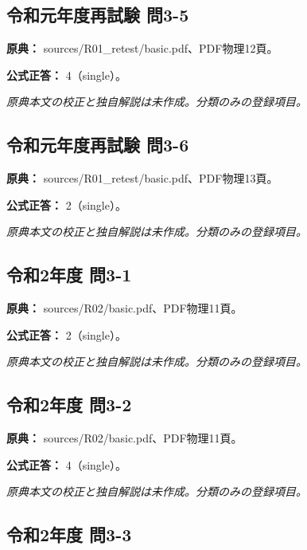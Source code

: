 \subsection{令和元年度再試験 問3-5}
\label{q:r01-ret-basic-3-5}

\noindent\textbf{原典：} sources/R01\_retest/basic.pdf、PDF物理12頁。

\textbf{公式正答：} 4（single）。

\par\textit{原典本文の校正と独自解説は未作成。分類のみの登録項目。}

\subsection{令和元年度再試験 問3-6}
\label{q:r01-ret-basic-3-6}

\noindent\textbf{原典：} sources/R01\_retest/basic.pdf、PDF物理13頁。

\textbf{公式正答：} 2（single）。

\par\textit{原典本文の校正と独自解説は未作成。分類のみの登録項目。}

\subsection{令和2年度 問3-1}
\label{q:r02-reg-basic-3-1}

\noindent\textbf{原典：} sources/R02/basic.pdf、PDF物理11頁。

\textbf{公式正答：} 2（single）。

\par\textit{原典本文の校正と独自解説は未作成。分類のみの登録項目。}

\subsection{令和2年度 問3-2}
\label{q:r02-reg-basic-3-2}

\noindent\textbf{原典：} sources/R02/basic.pdf、PDF物理11頁。

\textbf{公式正答：} 4（single）。

\par\textit{原典本文の校正と独自解説は未作成。分類のみの登録項目。}

\subsection{令和2年度 問3-3}
\label{q:r02-reg-basic-3-3}


